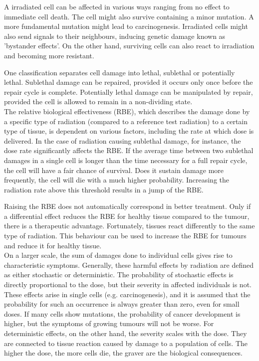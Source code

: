 A irradiated cell can be affected in various ways ranging from no effect to immediate cell death.
The cell might also survive containing a minor mutation.
A more fundamental mutation might lead to carcinogenesis.
Irradiated cells might also send signals to their neighbours, inducing genetic damage known as 'bystander effects'.
On the other hand, surviving cells can also react to irradiation and becoming more resistant.

One classification separates cell damage into lethal, sublethal or potentially lethal.
Sublethal damage can be repaired, provided it occurs only once before the repair cycle is complete.
Potentially lethal damage can be manipulated by repair, provided the cell is allowed to remain in a non-dividing state.\\

The relative biological effectiveness (RBE), which describes the damage done by a specific type of radiation (compared to a reference test radiation) to a certain type of tissue, is dependent on various factors, including the rate at which dose is delivered.
In the case of radiation causing sublethal damage, for instance, the dose rate significantly affects the RBE.
If the average time between two sublethal damages in a single cell is longer than the time necessary for a full repair cycle, the cell will have a fair chance of survival.
Does it sustain damage more frequently, the cell will die with a much higher probability.
Increasing the radiation rate above this threshold results in a jump of the RBE.

Raising the RBE does not automatically correspond in better treatment.
Only if a differential effect reduces the RBE for healthy tissue compared to the tumour, there is a therapeutic advantage.
Fortunately, tissues react differently to the same type of radiation.
This behaviour can be used to increase the RBE for tumours and reduce it for healthy tissue.\\

On a larger scale, the sum of damages done to individual cells gives rise to characteristic symptoms.
Generally, these harmful effects by radiation are defined as either stochastic or deterministic.
The probability of stochastic effects is directly proportional to the dose, but their severity in affected individuals is not.
These effects arise in single cells (e.g. carcinogenesis), and it is assumed that the probability for such an occurrence is always greater than zero, even for small doses.
If many cells show mutations, the probability of cancer development is higher, but the symptoms of growing tumours will not be worse.
For deterministic effects, on the other hand, the severity scales with the dose.
They are connected to tissue reaction caused by damage to a population of cells.
The higher the dose, the more cells die, the graver are the biological consequences.

